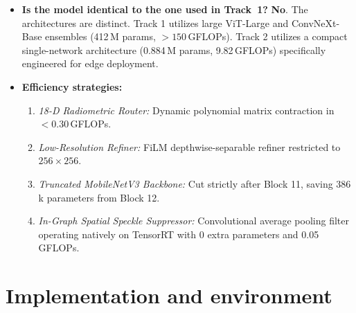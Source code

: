 \documentclass{article}
\begin{document}
\begin{itemize}[leftmargin=*]
\begin{itemize}
    \item \emph{ARM Cortex-A78AE CPU:} Latency \textbf{43.6 ms / frame} (\textbf{22.9 FPS}) on 12-core ARM CPU.
    \item \emph{Energy per frame:} $\approx 0.17$\,J / frame on 30W operational power mode.
  \end{itemize}
\item \textbf{Is the model identical to the one used in Track~1?} \textbf{No}. The architectures are distinct. Track 1 utilizes large ViT-Large and ConvNeXt-Base ensembles (412\,M params, $>150$\,GFLOPs). Track 2 utilizes a compact single-network architecture (0.884\,M params, 9.82\,GFLOPs) specifically engineered for edge deployment.
\item \textbf{Efficiency strategies:}
  \begin{enumerate}[leftmargin=*]
    \item \emph{18-D Radiometric Router:} Dynamic polynomial matrix contraction in $<0.30$\,GFLOPs.
    \item \emph{Low-Resolution Refiner:} FiLM depthwise-separable refiner restricted to $256\times256$.
    \item \emph{Truncated MobileNetV3 Backbone:} Cut strictly after Block 11, saving 386\,k parameters from Block 12.
    \item \emph{In-Graph Spatial Speckle Suppressor:} Convolutional average pooling filter operating natively on TensorRT with 0 extra parameters and 0.05\,GFLOPs.
  \end{enumerate}
\end{itemize}

\begin{table}[h]
    \centering
    \caption{Training statistics and computational metrics for Track~2.}
    \label{tab:t2}
\end{table}

\section{Implementation and environment}
\end{document}
